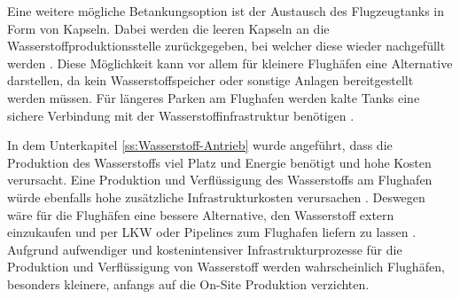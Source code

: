 %
Eine weitere mögliche Betankungsoption ist der Austausch des Flugzeugtanks in Form von Kapseln. 
Dabei werden die leeren Kapseln an die Wasserstoffproduktionsstelle zurückgegeben, 
bei welcher diese wieder nachgefüllt werden \cite{colpan2022fuel}. 
Diese Möglichkeit kann vor allem für kleinere Flughäfen eine Alternative darstellen, 
da kein Wasserstoffspeicher oder sonstige Anlagen bereitgestellt werden müssen.
Für längeres Parken am Flughafen werden kalte Tanks eine sichere Verbindung 
mit der Wasserstoffinfrastruktur benötigen \cite{colpan2022fuel}. %
%
%
%
%

In dem Unterkapitel \ref{ss:Wasserstoff-Antrieb} wurde angeführt, 
dass die Produktion des Wasserstoffs viel Platz und Energie benötigt und hohe Kosten verursacht. 
Eine Produktion und Verflüssigung des Wasserstoffs am Flughafen würde 
ebenfalls hohe zusätzliche Infrastrukturkosten verursachen \cite{dalmia2022powering}.
Deswegen wäre für die Flughäfen eine bessere Alternative, den Wasserstoff extern einzukaufen 
und per LKW oder Pipelines zum Flughafen liefern zu lassen \cite{gu2023hydrogen}.
Aufgrund aufwendiger und kostenintensiver Infrastrukturprozesse für die Produktion 
und Verflüssigung von Wasserstoff werden wahrscheinlich Flughäfen, 
besonders kleinere, anfangs auf die \glqq On-Site \grqq{} Produktion verzichten.

